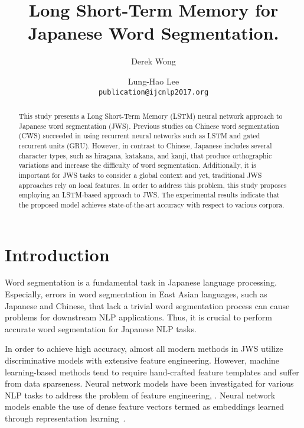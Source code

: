 \documentclass[11pt,letterpaper]{article}
\title{Long Short-Term Memory for Japanese Word Segmentation.}
\author{Derek Wong\and Lung-Hao Lee \\
  {\tt publication@ijcnlp2017.org}}
\date{}
\begin{document}
\maketitle

\setlength{\abovedisplayskip}{2pt} %
\setlength{\belowdisplayskip}{2pt} %

\begin{abstract}
This study presents a Long Short-Term Memory (LSTM) neural network approach to Japanese word segmentation (JWS). 
Previous studies on Chinese word segmentation (CWS) succeeded in using recurrent neural networks such as LSTM and gated recurrent units (GRU). 
However, in contrast to Chinese, Japanese includes several character types, such as hiragana, katakana, and kanji, that produce orthographic variations and increase the difficulty of word segmentation. 
Additionally, it is important for JWS tasks to consider a global context and yet, traditional JWS approaches rely on local features.
In order to address this problem, this study proposes employing an LSTM-based approach to JWS. 
The experimental results indicate that the proposed model achieves state-of-the-art accuracy with respect to various corpora. 

\end{abstract}

\section{Introduction}
Word segmentation is a fundamental task in Japanese language processing. 
Especially, errors in word segmentation in East Asian languages, such as Japanese and Chinese, that lack a trivial word segmentation process can cause problems for downstream NLP applications.
Thus, it is crucial to perform accurate word segmentation for Japanese NLP tasks.


In order to achieve high accuracy, almost all modern methods in JWS utilize discriminative models with extensive feature engineering.
However, machine learning-based methods tend to require hand-crafted feature templates and suffer from data sparseness.
Neural network models have been investigated for various NLP tasks to address the problem of feature engineering, \cite{liu2015multi,sutskever2014sequence,socher2013parsing,turian2010word,mikolov2013distributed}.
Neural network models enable the use of dense feature vectors termed as embeddings learned through representation learning~\cite{NIPS20135021}. 
\end{document}
